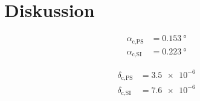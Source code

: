 \section{Diskussion}
\label{sec:Diskussion}

\begin{align}
    \alpha _\text{c,PS} &= \SI{0.153}{\degree} \\
    \alpha _\text{c,SI} &= \SI{0.223}{\degree}
\end{align}

\begin{align}
    \delta _\text{c,PS} &= \num{3.5e-6} \\
    \delta _\text{c,SI} &= \num{7.6e-6}
\end{align}
